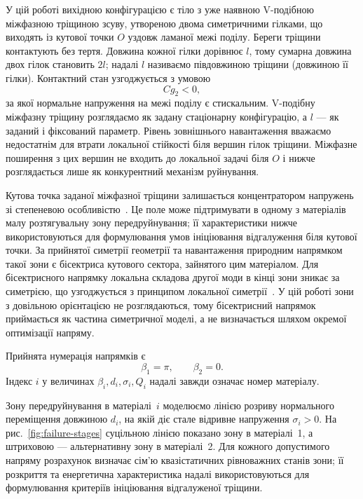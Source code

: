У цій роботі вихідною конфігурацією є тіло з уже наявною V-подібною
міжфазною тріщиною зсуву, утвореною двома симетричними гілками, що
виходять із кутової точки $O$ уздовж ламаної межі поділу. Береги
тріщини контактують без тертя. Довжина кожної гілки дорівнює $l$, тому
сумарна довжина двох гілок становить $2l$; надалі $l$ називаємо
півдовжиною тріщини (довжиною її гілки). Контактний стан узгоджується з
умовою
\begin{equation*}
  Cg_2<0,
\end{equation*}
за якої нормальне напруження на межі поділу є стискальним. V-подібну
міжфазну тріщину розглядаємо як задану стаціонарну конфігурацію, а $l$
--- як заданий і фіксований параметр. Рівень зовнішнього навантаження
вважаємо недостатнім для втрати локальної стійкості біля вершин
гілок тріщини. Міжфазне поширення з цих вершин не входить до
локальної задачі біля $O$ і нижче розглядається лише як конкурентний
механізм руйнування.

Кутова точка заданої міжфазної тріщини залишається концентратором
напружень зі степеневою особливістю~\cite{NazarenkoKipnis2022Stress}.
Це поле може підтримувати в одному з матеріалів малу розтягувальну зону
передруйнування; її характеристики нижче використовуються для
формулювання умов ініціювання відгалуження біля кутової точки. За прийнятої симетрії
геометрії та навантаження природним напрямком такої зони є бісектриса кутового сектора,
зайнятого цим матеріалом. Для бісектрисного напрямку локальна складова
другої моди в кінці зони зникає за симетрією, що узгоджується з принципом
локальної симетрії~\cite{BarenblattCherepanov1961,GoldsteinSalganik1974}. У цій роботі зони з довільною орієнтацією не
розглядаються, тому бісектрисний напрямок приймається як частина
симетричної моделі, а не визначається шляхом окремої оптимізації напряму.

Прийнята нумерація напрямків є
\begin{equation*}
  \beta_1=\pi,\qquad \beta_2=0.
\end{equation*}
Індекс $i$ у величинах $\beta_i,d_i,\sigma_i,Q_i$ надалі завжди означає
номер матеріалу.

Зону передруйнування в матеріалі~$i$ моделюємо лінією розриву нормального
переміщення довжиною $d_i$, на якій діє стале відривне напруження
$\sigma_i>0$. На рис.~\ref{fig:failure-stages} суцільною лінією показано зону
в матеріалі~1, а штриховою --- альтернативну зону в матеріалі~2. Для
кожного допустимого напряму розрахунок визначає сім'ю квазістатичних
рівноважних станів зони; її розкриття та енергетична характеристика
надалі використовуються для формулювання критеріїв ініціювання
відгалуженої тріщини.

